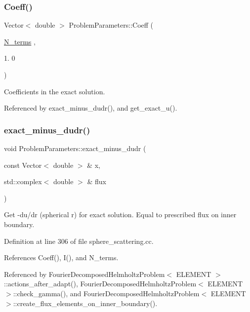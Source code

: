 \subsubsection{\texorpdfstring{Coeff()}{Coeff()}}
{\footnotesize\ttfamily Vector$<$ double $>$ Problem\+Parameters\+::\+Coeff (\begin{DoxyParamCaption}\item[{\hyperlink{namespaceProblemParameters_a6361f0f1c4a120e62d28db64baa84b40}{N\+\_\+terms}}]{,  }\item[{1.}]{0 }\end{DoxyParamCaption})}



Coefficients in the exact solution. 



Referenced by exact\+\_\+minus\+\_\+dudr(), and get\+\_\+exact\+\_\+u().

\mbox{\label{namespaceProblemParameters_aa544d1f3e384d3283f7113512931ea8f}} 
\subsubsection{\texorpdfstring{exact\+\_\+minus\+\_\+dudr()}{exact\_minus\_dudr()}}
{\footnotesize\ttfamily void Problem\+Parameters\+::exact\+\_\+minus\+\_\+dudr (\begin{DoxyParamCaption}\item[{const Vector$<$ double $>$ \&}]{x,  }\item[{std\+::complex$<$ double $>$ \&}]{flux }\end{DoxyParamCaption})}



Get -\/du/dr (spherical r) for exact solution. Equal to prescribed flux on inner boundary. 



Definition at line 306 of file sphere\+\_\+scattering.\+cc.



References Coeff(), I(), and N\+\_\+terms.



Referenced by Fourier\+Decomposed\+Helmholtz\+Problem$<$ E\+L\+E\+M\+E\+N\+T $>$\+::actions\+\_\+after\+\_\+adapt(), Fourier\+Decomposed\+Helmholtz\+Problem$<$ E\+L\+E\+M\+E\+N\+T $>$\+::check\+\_\+gamma(), and Fourier\+Decomposed\+Helmholtz\+Problem$<$ E\+L\+E\+M\+E\+N\+T $>$\+::create\+\_\+flux\+\_\+elements\+\_\+on\+\_\+inner\+\_\+boundary().

